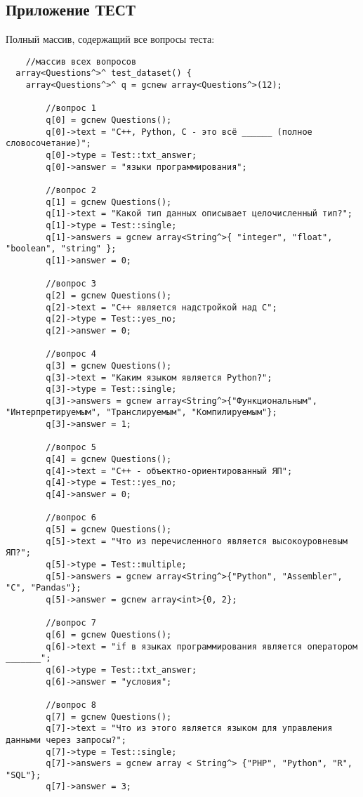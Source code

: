 \subsection*{Приложение ТЕСТ}
Полный массив, содержащий все вопросы теста:
\begin{verbatim}
    //массив всех вопросов 
  array<Questions^>^ test_dataset() {
    array<Questions^>^ q = gcnew array<Questions^>(12);

        //вопрос 1
        q[0] = gcnew Questions();
        q[0]->text = "C++, Python, C - это всё ______ (полное словосочетание)";
        q[0]->type = Test::txt_answer;
        q[0]->answer = "языки программирования";

        //вопрос 2
        q[1] = gcnew Questions();
        q[1]->text = "Какой тип данных описывает целочисленный тип?";
        q[1]->type = Test::single;
        q[1]->answers = gcnew array<String^>{ "integer", "float", "boolean", "string" };
        q[1]->answer = 0;

        //вопрос 3
        q[2] = gcnew Questions();
        q[2]->text = "C++ является надстройкой над C";
        q[2]->type = Test::yes_no;
        q[2]->answer = 0;

        //вопрос 4
        q[3] = gcnew Questions();
        q[3]->text = "Каким языком является Python?";
        q[3]->type = Test::single;
        q[3]->answers = gcnew array<String^>{"Функциональным", "Интерпретируемым", "Транслируемым", "Компилируемым"};
        q[3]->answer = 1;

        //вопрос 5
        q[4] = gcnew Questions();
        q[4]->text = "C++ - объектно-ориентированный ЯП";
        q[4]->type = Test::yes_no;
        q[4]->answer = 0;

        //вопрос 6
        q[5] = gcnew Questions();
        q[5]->text = "Что из перечисленного является высокоуровневым ЯП?";
        q[5]->type = Test::multiple;
        q[5]->answers = gcnew array<String^>{"Python", "Assembler", "C", "Pandas"};
        q[5]->answer = gcnew array<int>{0, 2};

        //вопрос 7
        q[6] = gcnew Questions();
        q[6]->text = "if в языках программирования является оператором _______";
        q[6]->type = Test::txt_answer;
        q[6]->answer = "условия";

        //вопрос 8
        q[7] = gcnew Questions();
        q[7]->text = "Что из этого является языком для управления данными через запросы?";
        q[7]->type = Test::single;
        q[7]->answers = gcnew array < String^> {"PHP", "Python", "R", "SQL"};
        q[7]->answer = 3;


\end{verbatim}
